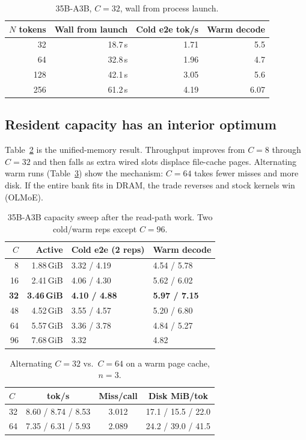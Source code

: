 \documentclass[11pt]{article}
\theoremstyle{definition}
\begin{document}
\begin{table}[t]
\centering
\caption{35B-A3B, $C{=}32$, wall from process launch.}
\label{tab:wall}
\small
\begin{tabular}{@{}rrrr@{}}
\toprule
$N$ tokens & Wall from launch & Cold e2e tok/s & Warm decode \\
\midrule
32 & 18.7\,s & 1.71 & 5.5 \\
64 & 32.8\,s & 1.96 & 4.7 \\
128 & 42.1\,s & 3.05 & 5.6 \\
256 & 61.2\,s & 4.19 & 6.07 \\
\bottomrule
\end{tabular}
\end{table}

\subsection{Resident capacity has an interior optimum}

Table~\ref{tab:csweep} is the unified-memory result. Throughput improves from $C{=}8$ through $C{=}32$ and then falls as extra wired slots displace file-cache pages. Alternating warm runs (Table~\ref{tab:c3264}) show the mechanism: $C{=}64$ takes fewer misses and more disk. If the entire bank fits in DRAM, the trade reverses and stock kernels win (OLMoE).

\begin{table}[t]
\centering
\caption{35B-A3B capacity sweep after the read-path work. Two cold/warm reps except $C{=}96$.}
\label{tab:csweep}
\small
\begin{tabular}{@{}rrll@{}}
\toprule
$C$ & Active & Cold e2e (2 reps) & Warm decode \\
\midrule
8 & 1.88\,GiB & 3.32 / 4.19 & 4.54 / 5.78 \\
16 & 2.41\,GiB & 4.06 / 4.30 & 5.62 / 6.02 \\
\textbf{32} & \textbf{3.46\,GiB} & \textbf{4.10 / 4.88} & \textbf{5.97 / 7.15} \\
48 & 4.52\,GiB & 3.55 / 4.57 & 5.20 / 6.80 \\
64 & 5.57\,GiB & 3.36 / 3.78 & 4.84 / 5.27 \\
96 & 7.68\,GiB & 3.32 & 4.82 \\
\bottomrule
\end{tabular}
\end{table}

\begin{table}[t]
\centering
\caption{Alternating $C{=}32$ vs.\ $C{=}64$ on a warm page cache, $n{=}3$.}
\label{tab:c3264}
\small
\begin{tabular}{@{}lccc@{}}
\toprule
$C$ & tok/s & Miss/call & Disk MiB/tok \\
\midrule
32 & 8.60 / 8.74 / 8.53 & 3.012 & 17.1 / 15.5 / 22.0 \\
64 & 7.35 / 6.31 / 5.93 & 2.089 & 24.2 / 39.0 / 41.5 \\
\bottomrule
\end{tabular}
\end{table}
\end{document}
